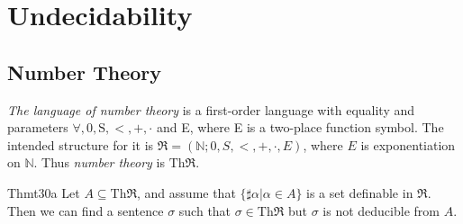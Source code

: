 \chapter{Undecidability}
\setcounter{section}{-1}

\section{Number Theory}

\textit{The language of number theory} is a first-order language with equality and parameters $\forall, 0, \mathrm{S}, <, +, \cdot$ and E, where E is a two-place function symbol. The intended structure for it is $\mathfrak{R}=(\mathbb{N};0,S,<,+,\cdot,E)$, where $E$ is exponentiation on $\mathbb{N}$. Thus \textit{number theory} is $\mathrm{Th}\mathfrak{R}$.

\begin{reference}{Thm}{t30a}
  Let $A\subseteq \mathrm{Th}\mathfrak{R}$, and assume that $\{\sharp\alpha|\alpha\in A\}$ is a set definable in $\mathfrak{R}$. Then we can find a sentence $\sigma$ such that $\sigma\in \mathrm{Th}\mathfrak{R}$ but $\sigma$ is not deducible from $A$.
\end{reference}

